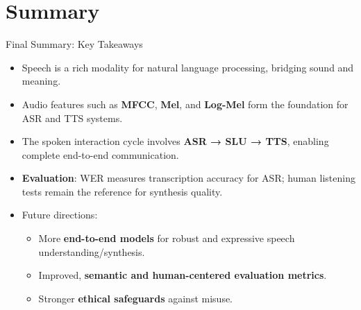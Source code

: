 \section{Summary}

\begin{frame}[allowframebreaks]{Final Summary: Key Takeaways}

\begin{itemize}
    \item Speech is a rich modality for natural language processing, bridging sound and meaning.

    \item Audio features such as \textbf{MFCC}, \textbf{Mel}, and \textbf{Log-Mel} form the foundation for ASR and TTS systems.

    \item The spoken interaction cycle involves \textbf{ASR → SLU → TTS}, enabling complete end-to-end communication.

    \item \textbf{Evaluation}: WER measures transcription accuracy for ASR; human listening tests remain the reference for synthesis quality.

    \item Future directions:
    \begin{itemize}
        \item More \textbf{end-to-end models} for robust and expressive speech understanding/synthesis.
        \item Improved, \textbf{semantic and human-centered evaluation metrics}.
        \item Stronger \textbf{ethical safeguards} against misuse.
    \end{itemize}
\end{itemize}

\end{frame}

